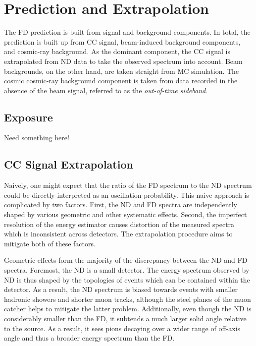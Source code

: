 \section{Prediction and Extrapolation}
\label{extrap_section}

The FD prediction is built from signal and background components.
In total, the prediction is built up from \numu CC signal, beam-induced
background components, and cosmic-ray background.
As the dominant component, the \numu CC signal is extrapolated from
ND data to take the observed spectrum into account.
Beam backgrounds, on the other hand, are taken straight from MC simulation.
The cosmic cosmic-ray background component is taken from data recorded
in the absence of the \numi beam signal, referred to as the
\textit{out-of-time sideband}.

\subsection{Exposure}

Need something here!

\subsection{\numu CC Signal Extrapolation}

Naively, one might expect that the ratio of the FD spectrum to the ND spectrum
could be directly interpreted as an oscillation probability.
This naive approach is complicated by two factors.
First, the ND and FD spectra are independently shaped by various geometric
and other systematic effects.
Second, the imperfect resolution of the energy estimator causes
distortion of the measured spectra which is inconsistent across detectors.
The extrapolation procedure aims to mitigate both of these factors.

Geometric effects form the majority of the discrepancy between the
ND and FD spectra.
Foremost, the ND is a small detector.
The energy spectrum observed by ND is thus shaped by the topologies
of events which can be contained within the detector.
As a result, the ND spectrum is biased towards events with
smaller hadronic showers and shorter muon tracks, although the steel planes
of the muon catcher helps to mitigate the latter problem.
Additionally, even though the ND is considerably smaller than the FD,
it subtends a much larger solid angle relative to the \numi source.
As a result, it sees pions decaying over a wider range of off-axis angle
and thus a broader energy spectrum than the FD.


